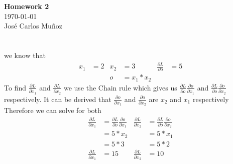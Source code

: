 \documentclass[12pt,english]{article}
\begin{document}
\begin{center}
    \Large
    \textbf{Homework 2}\\
    \small
    \today\\
    \large
    Jos\'{e} Carlos Mu\~{n}oz
\end{center}
\section{}
we know that
\begin{align*}
x_1&=2 & x_2&= 3 & \frac{\partial L}{\partial o}&=5\\
     &     & o   &= x_1 * x_2 
\end{align*}
To find $\frac{\partial L}{\partial x_1}$ and $\frac{\partial L}{\partial x_2}$ we use the Chain rule which gives us $\frac{\partial L}{\partial o}\frac{\partial o}{\partial x_1}$ and $\frac{\partial L}{\partial o}\frac{\partial o}{\partial x_2}$ respectively. It can be derived that $\frac{\partial o}{\partial x_1}$ and $\frac{\partial o}{\partial x_2}$ are $x_2$ and $x_1$ respectively\\
Therefore we can solve for both\\
\begin{align*}
\frac{\partial L}{\partial x_1}&=\frac{\partial L}{\partial o}\frac{\partial o}{\partial x_1} & \frac{\partial L}{\partial x_2}&=\frac{\partial L}{\partial o}\frac{\partial o}{\partial x_2}\\
                                      &=5*x_2  &  &=5 *x_1\\
                                      &=5*3  &  &=5 *2\\
\frac{\partial L}{\partial x_1}&=15  &  \frac{\partial L}{\partial x_2}&=10\\
\end{align*}
\end{document}
